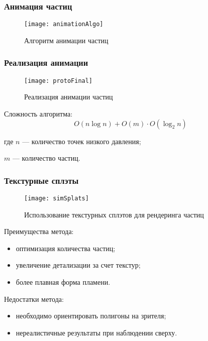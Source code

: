 \begin{frame}
\frametitle{Анимация частиц}
\begin{figure}
	\centering
    \texttt{[image: animationAlgo]}
    \caption{Алгоритм анимации частиц}%
    \label{fig:animationAlgo}
\end{figure}
\end{frame}

\begin{frame}[t]
\frametitle{Реализация анимации}
\begin{wrapfigure}{r}{0.3\textwidth}
	\centering
    \texttt{[image: protoFinal]}
    \caption{Реализация анимации частиц}%
    \label{fig:protoFinal}
\end{wrapfigure}
Сложность алгоритма:
\begin{equation}
    O(n \log n) + O(m) \cdot O(\log_{2} n)
\end{equation}
\begin{explanationx}
    \item [где] $n$ --- количество точек низкого давления;
    \item $m$ --- количество частиц.
\end{explanationx}
\end{frame}

\begin{frame}[t]
\frametitle{Текстурные сплэты}
\begin{wrapfigure}{r}{0.3\textwidth}
	\centering
    \texttt{[image: simSplats]}
    \caption{Использование текстурных сплэтов для рендеринга частиц}%
    \label{fig:protoSplats}
\end{wrapfigure}
Преимущества метода:
\begin{itemize}
    \item оптимизация количества частиц;
    \item увеличение детализации за счет текстур;
    \item более плавная форма пламени.
\end{itemize}

Недостатки метода:
\begin{itemize}
    \item необходимо ориентировать полигоны на зрителя;
    \item нереалистичные результаты при наблюдении сверху.
\end{itemize}
\end{frame}


